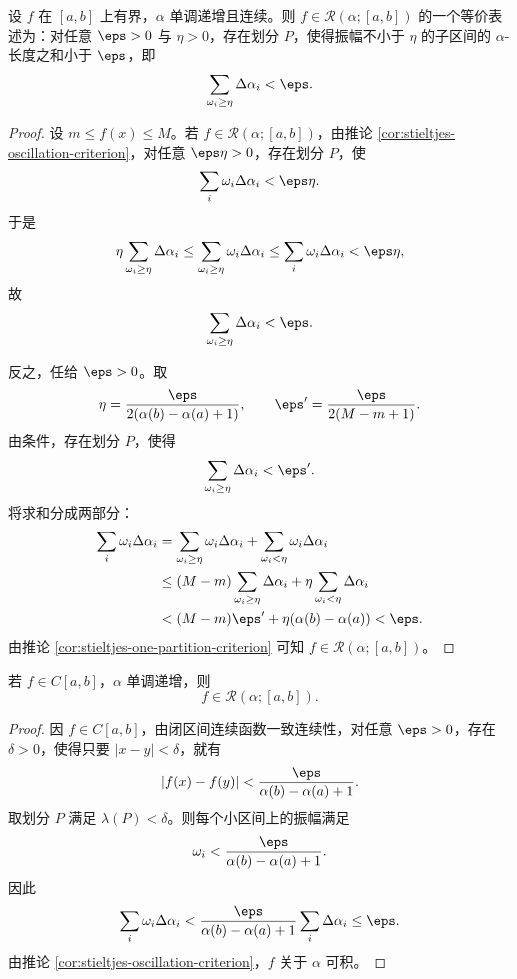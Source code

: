 \begin{corollary}\label{cor:stieltjes-third-criterion}
	设 $f$ 在 $[a,b]$ 上有界，$\alpha$ 单调递增且连续。则 $f\in\mathcal R(\alpha;[a,b])$ 的一个等价表述为：对任意 $\eps>0$ 与 $\eta>0$，存在划分 $P$，使得振幅不小于 $\eta$ 的子区间的 $\alpha$-长度之和小于 $\eps$，即
	\[
	\sum_{\omega_i\geq\eta}\Delta\alpha_i<\eps.
	\]
\end{corollary}

\begin{proof}
	设 $m\leq f(x)\leq M$。若 $f\in\mathcal R(\alpha;[a,b])$，由推论 \ref{cor:stieltjes-oscillation-criterion}，对任意 $\eps\eta>0$，存在划分 $P$，使
	\[
	\sum_i\omega_i\Delta\alpha_i<\eps\eta.
	\]
	于是
	\[
	\eta\sum_{\omega_i\geq\eta}\Delta\alpha_i
	\leq \sum_{\omega_i\geq\eta}\omega_i\Delta\alpha_i
	\leq \sum_i\omega_i\Delta\alpha_i
	<\eps\eta,
	\]
	故
	\[
	\sum_{\omega_i\geq\eta}\Delta\alpha_i<\eps.
	\]
	
	反之，任给 $\eps>0$。取
	\[
	\eta=\frac{\eps}{2(\alpha(b)-\alpha(a)+1)},
	\qquad
	\eps' =\frac{\eps}{2(M-m+1)}.
	\]
	由条件，存在划分 $P$，使得
	\[
	\sum_{\omega_i\geq\eta}\Delta\alpha_i<\eps'.
	\]
	将求和分成两部分：
	\[
	\begin{aligned}
		\sum_i\omega_i\Delta\alpha_i
		&=\sum_{\omega_i\geq\eta}\omega_i\Delta\alpha_i
		+\sum_{\omega_i<\eta}\omega_i\Delta\alpha_i \\
		&\leq (M-m)\sum_{\omega_i\geq\eta}\Delta\alpha_i
		+\eta\sum_{\omega_i<\eta}\Delta\alpha_i \\
		&< (M-m)\eps'+\eta(\alpha(b)-\alpha(a))<\eps.
	\end{aligned}
	\]
	由推论 \ref{cor:stieltjes-one-partition-criterion} 可知 $f\in\mathcal R(\alpha;[a,b])$。
\end{proof}


\begin{proposition}\label{prop:continuous-integrand-stieltjes}
	若 $f\in C[a,b]$，$\alpha$ 单调递增，则
	\[
	f\in\mathcal R(\alpha;[a,b]).
	\]
\end{proposition}

\begin{proof}
	因 $f\in C[a,b]$，由闭区间连续函数一致连续性，对任意 $\eps>0$，存在 $\delta>0$，使得只要 $|x-y|<\delta$，就有
	\[
	|f(x)-f(y)|<\frac{\eps}{\alpha(b)-\alpha(a)+1}.
	\]
	取划分 $P$ 满足 $\lambda(P)<\delta$。则每个小区间上的振幅满足
	\[
	\omega_i<\frac{\eps}{\alpha(b)-\alpha(a)+1}.
	\]
	因此
	\[
	\sum_i \omega_i\Delta\alpha_i
	<\frac{\eps}{\alpha(b)-\alpha(a)+1}
	\sum_i\Delta\alpha_i
	\leq \eps.
	\]
	由推论 \ref{cor:stieltjes-oscillation-criterion}，$f$ 关于 $\alpha$ 可积。
\end{proof}

